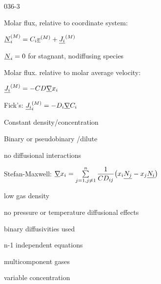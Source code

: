 \begin{mitframe}{036-3}
\begin{listone}
	\item Molar flux, relative to coordinate system:
    \item $\uline{\nummoles}_{\state}^{(M)}=\conc_{\state}\uline{\vvel}^{(M)}+\uline{\molspecflux}^{(M)}$
    	\begin{listtwo}
        	\item $\uline{\nummoles}_{\state}=0$ for stagnant, nodiffusing species
        \end{listtwo}
\item Molar flux. relative to molar average velocity:
\item $\uline{\molspecflux}^{(M)}=-\conc\elecdisplace\gradop\specfrac{i}$

\item Fick's: $\uline{\molspecflux}_{\state}^{(M)}=-\pdiff\gradop\conc_{\state}$
	\begin{listtwo}
    	\item Constant density/concentration
        \item Binary or pseudobinary /dilute
        	\begin{listthree}
            	\item no diffusional interactions
            \end{listthree}
    \end{listtwo}
\item Stefan-Maxwell: $\gradop\specfrac{i}=\sum\limits_{j=1, j\neq{1}}^{n}\dfrac{1}{\conc\diff}\big(\specfrac{i}\uline{\nummoles_{j}}-\specfrac{j}\uline{\nummoles_{\state}}\big)$

		\begin{listtwo}
        	\item low gas density
            \item no pressure or temperature diffusional effects
            \item binary diffusivities used
            \item n-1 independent equations
            \item multicomponent gases
            \item variable concentration
        \end{listtwo}
\end{listone}        
\end{mitframe}